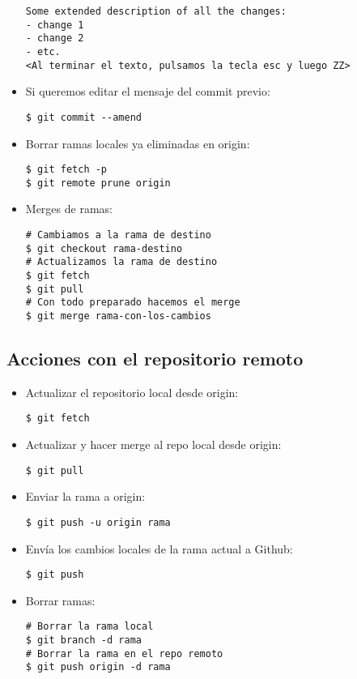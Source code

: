 \begin{itemize}[label=-]
\begin{lstlisting}
Some extended description of all the changes:
- change 1
- change 2
- etc.
<Al terminar el texto, pulsamos la tecla esc y luego ZZ>
\end{lstlisting}

\item Si queremos editar el mensaje del commit previo:
\begin{lstlisting}
$ git commit --amend
\end{lstlisting}

\item Borrar ramas locales ya eliminadas en origin:
\begin{lstlisting}
$ git fetch -p
$ git remote prune origin
\end{lstlisting}

\item Merges de ramas:
\begin{lstlisting}
# Cambiamos a la rama de destino
$ git checkout rama-destino
# Actualizamos la rama de destino
$ git fetch
$ git pull
# Con todo preparado hacemos el merge
$ git merge rama-con-los-cambios
\end{lstlisting}

\end{itemize}


\subsection{Acciones con el repositorio remoto}

\begin{itemize}[label=-]

\item Actualizar el repositorio local desde origin:
\begin{lstlisting}
$ git fetch
\end{lstlisting}

\item Actualizar y hacer merge al repo local desde origin:
\begin{lstlisting}
$ git pull
\end{lstlisting}

\item Enviar la rama a origin:
\begin{lstlisting}
$ git push -u origin rama
\end{lstlisting}

\item Envía los cambios locales de la rama actual a Github:
\begin{lstlisting}
$ git push
\end{lstlisting}

\item Borrar ramas:
\begin{lstlisting}
# Borrar la rama local
$ git branch -d rama
# Borrar la rama en el repo remoto
$ git push origin -d rama
\end{lstlisting}
\end{itemize}

